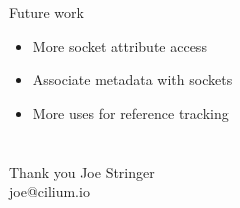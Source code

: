 \documentclass[black,white]{beamer}
\begin{document}
    \begin{frame}{Future work}
        \begin{itemize}
            \item More socket attribute access \bigskip
            \item Associate metadata with sockets \bigskip
            \item More uses for reference tracking \bigskip
        \end{itemize}
    \end{frame}

    \section{}
    \begin{frame}{Thank you}
        \vfill
	\centering
	Joe Stringer \\\medskip
	joe@cilium.io
	\vfill
    \end{frame}

\end{document}
